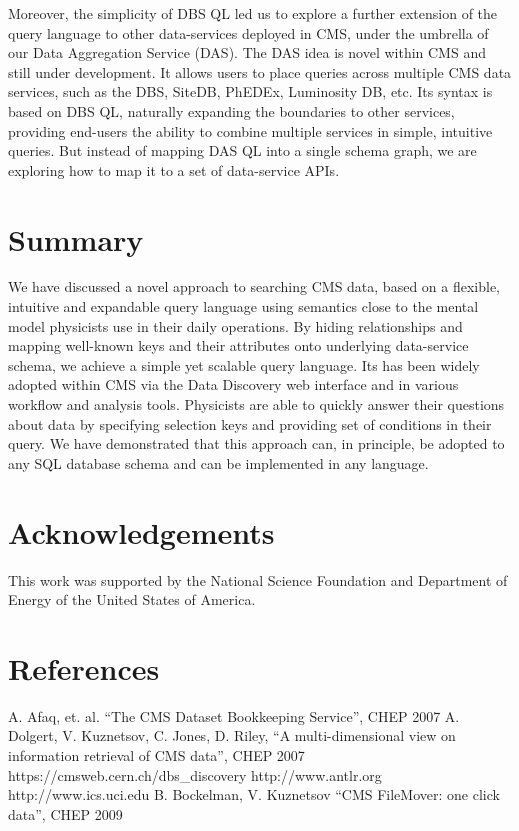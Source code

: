 \documentclass[a4paper]{jpconf}
\begin{document}
Moreover, the simplicity of DBS QL led us to explore a further
extension of the query language to other data-services deployed in CMS, under
the umbrella of our Data Aggregation Service (DAS). The DAS idea is
novel within CMS and still under development.
It allows users to place queries across multiple CMS data services,
such as the DBS, SiteDB, PhEDEx, Luminosity DB, etc.  Its syntax
is based on DBS QL, naturally
expanding the boundaries to other services, providing
end-users the ability to combine multiple services in simple, intuitive
queries. But instead of mapping DAS QL into a single
schema graph, we are exploring how to map it to a set of data-service APIs.

\section{Summary}
We have discussed a novel approach to searching CMS data,
based on a flexible,
intuitive and expandable query language using
semantics close to the mental model physicists use in their 
daily operations.
By hiding relationships and mapping well-known
keys and their attributes onto underlying data-service
schema, we achieve a simple yet scalable query language. Its 
has been widely adopted within CMS via the Data Discovery web interface and
in various workflow and analysis tools. Physicists
are able to quickly answer their questions about data by
specifying selection keys and providing set of conditions
in their query. We have demonstrated that this approach
can, in principle, be adopted to any SQL database schema and can be implemented
in any language.

\section{Acknowledgements}

This work was supported by the National Science Foundation and Department of Energy of the United States of America.

\section*{References}
\begin{thebibliography}{9}
 A. Afaq, et. al. ``The CMS Dataset Bookkeeping Service'', CHEP 2007 
 A. Dolgert, V. Kuznetsov, C. Jones, D. Riley, 
``A multi-dimensional view on information retrieval of CMS data'', CHEP 2007
 https://cmsweb.cern.ch/dbs\_discovery
 http://www.antlr.org
 http://www.ics.uci.edu
 B. Bockelman, V. Kuznetsov ``CMS FileMover: one click data'', CHEP 2009

\end{thebibliography}
\end{document}
